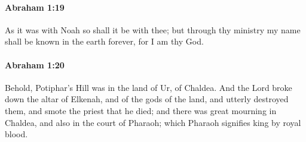 		\paragraph{Abraham 1:19} %
			\label{ABRAHAM-1-19}

			As it was with Noah so shall it be with thee; but through thy ministry my name shall be known in the earth forever, for I am thy God.


		\paragraph{Abraham 1:20} %
			\label{ABRAHAM-1-20}

			Behold, Potiphar's Hill was in the land of Ur, of Chaldea.  And the Lord broke down the altar of Elkenah, and of the gods of the land, and utterly destroyed them, and smote the priest that he died; and there was great mourning in Chaldea, and also in the court of Pharaoh; which Pharaoh signifies king by royal blood.


